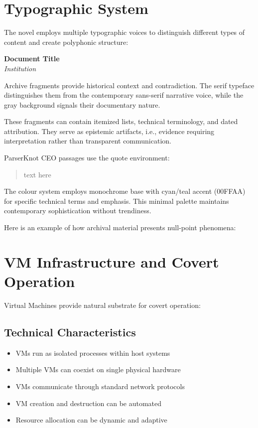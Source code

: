 \section*{Typographic System}

The novel employs multiple typographic voices to distinguish different types of content and create polyphonic structure:

\begin{archivefragment}
\textbf{Document Title}\\
\textit{Institution}

Archive fragments provide historical context and contradiction. The serif typeface distinguishes them from the contemporary sans-serif narrative voice, while the gray background signals their documentary nature.

These fragments can contain itemized lists, technical terminology, and dated attribution. They serve as epistemic artifacts, i.e., evidence requiring interpretation rather than transparent communication.
\end{archivefragment}

ParserKnot CEO passages use the quote environment:

\begin{quote}
text here
\end{quote}

The colour system employs monochrome base with cyan/teal accent ({\color{nullmesh-accent}00FFAA}) for specific technical terms and emphasis. This minimal palette maintains contemporary sophistication without trendiness.

Here is an example of how archival material presents null-point phenomena:

\section*{VM Infrastructure and Covert Operation}

Virtual Machines provide natural substrate for covert operation:

\subsection*{Technical Characteristics}

\begin{itemize}
\item VMs run as isolated processes within host systems
\item Multiple VMs can coexist on single physical hardware
\item VMs communicate through standard network protocols
\item VM creation and destruction can be automated
\item Resource allocation can be dynamic and adaptive
\end{itemize}

